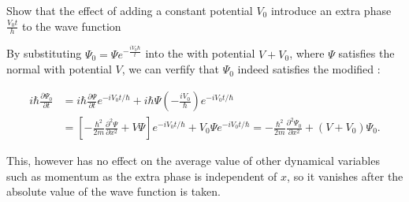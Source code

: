 \documentclass[a4paper,12pt]{report}
\begin{document}
{Show that the effect of adding a constant potential \(V_0\) introduce an extra phase \(\frac{V_0t}{h}\) to the wave function}
{By substituting \(\Psi_0 = \Psi e^{-\frac{iV_0\hbar}{t}}\) into the \screq with potential \(V + V_0\), where \(\Psi\) satisfies the normal \screq with potential \(V\), we can verfify that \(\Psi_0\) indeed satisfies the modified \screq: 
			
\begin{equation}
	\begin{aligned}
		i \hbar \frac{\partial \Psi_0}{\partial t} & =i \hbar \frac{\partial \Psi}{\partial t} e^{-i V_0 t / \hbar}+i \hbar \Psi\left(-\frac{i V_0}{\hbar}\right) e^{-i V_0 t / \hbar} \\ &=\left[-\frac{\hbar^2}{2 m} \frac{\partial^2 \Psi}{\partial x^2}+V \Psi\right] e^{-i V_0 t / \hbar}+V_0 \Psi e^{-i V_0 t / \hbar} =-\frac{\hbar^2}{2 m} \frac{\partial^2 \Psi_0}{\partial x^2}+\left(V+V_0\right) \Psi_0 .
	\end{aligned}
\end{equation}
		
This, however has no effect on the average value of other dynamical variables such as momentum as the extra phase is independent of \(x\), so it vanishes after the absolute value of the wave function is taken.}
		
\end{document}
